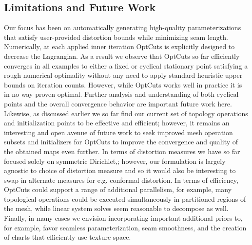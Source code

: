 \subsection{Limitations and Future Work}
Our focus has been on automatically generating high-quality parameterizations that satisfy user-provided distortion bounds while minimizing seam length. Numerically, at each applied inner iteration OptCuts is explicitly designed to decrease the Lagrangian. As a result we observe that OptCuts so far efficiently converges in all examples to either a fixed or cyclical stationary point satisfying a rough numerical optimality without any need to apply standard heuristic upper bounds on iteration counts. However, while OptCuts works well in practice it is in no way proven optimal. Further analysis and understanding of both cyclical points and the overall convergence behavior are important future work here. Likewise, as discussed earlier we so far find our current set of topology operations and initialization points to be effective and efficient; however, it remains an interesting and open avenue of future work to seek improved mesh operation subsets and initializers for OptCuts to improve the convergence and quality of the obtained maps even further. In terms of distortion measures we have so far focused solely on symmetric Dirichlet,; however, our formulation is largely agnostic to choice of distortion measure and so it would also be interesting to swap in alternate measures for e.g. conformal distortion. In terms of efficiency, OptCuts could support a range 
of additional parallelism, for example, many topological operations could be executed simultaneously in partitioned regions of the mesh, while linear system solves seem reasonable to decompose as well. Finally, in many cases we envision incorporating important additional priors to, for example, favor seamless parameterization, seam smoothness, and the creation of charts that efficiently use texture space. 


%

